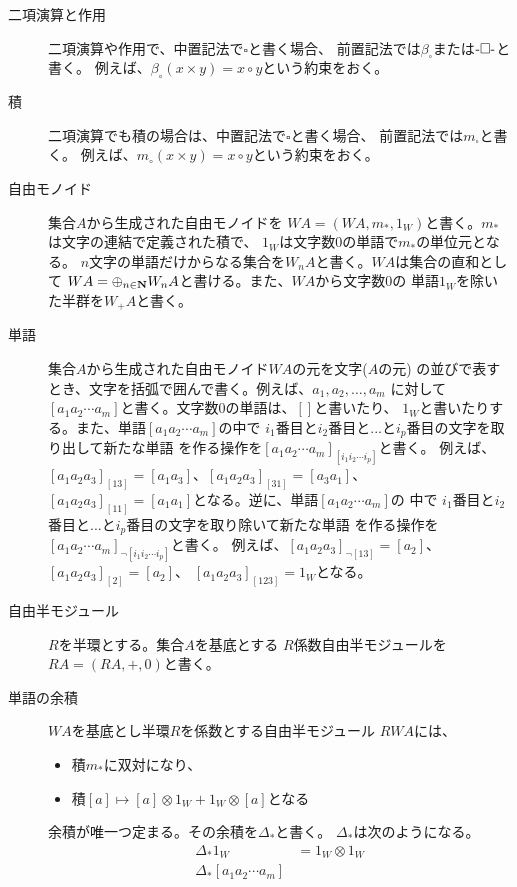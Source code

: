 	\begin{description} %
		\item[二項演算と作用]二項演算や作用で、中置記法で$\square$と書く場合、
		前置記法では$\beta_\square$または$\mybiop{\square}$と書く。
		例えば、$\beta_\circ(x\times y)=x\circ y$という約束をおく。
		\item[積]二項演算でも積の場合は、中置記法で$\square$と書く場合、
		前置記法では$m_\square$と書く。
		例えば、$m_\circ(x\times y)=x\circ y$という約束をおく。
		\item[自由モノイド]集合$A$から生成された自由モノイドを
		$WA=(WA,m_*,1_W)$と書く。$m_*$は文字の連結で定義された積で、
		$1_W$は文字数$0$の単語で$m_*$の単位元となる。
		$n$文字の単語だけからなる集合を$W_nA$と書く。$WA$は集合の直和として
		$WA = \oplus_{n\in{\mathbf{N}}}W_nA$と書ける。また、$WA$から文字数$0$の
		単語$1_W$を除いた半群を$W_+A$と書く。
		\item[単語]集合$A$から生成された自由モノイド$WA$の元を文字($A$の元)
		の並びで表すとき、文字を括弧で囲んで書く。例えば、$a_1,a_2,\dots,a_m$
		に対して$[a_1a_2\cdots a_m]$と書く。文字数$0$の単語は、$[]$と書いたり、
		$1_W$と書いたりする。また、単語$[a_1a_2\cdots a_m]$の中で
		$i_1$番目と$i_2$番目と...と$i_p$番目の文字を取り出して新たな単語
		を作る操作を$[a_1a_2\cdots a_m]_{[i_1i_2\cdots i_p]}$と書く。
		例えば、$[a_1a_2a_3]_{[13]}=[a_1a_3]$、$[a_1a_2a_3]_{[31]}=[a_3a_1]$、
		$[a_1a_2a_3]_{[11]}=[a_1a_1]$となる。逆に、単語$[a_1a_2\cdots a_m]$の
		中で $i_1$番目と$i_2$番目と...と$i_p$番目の文字を取り除いて新たな単語
		を作る操作を$[a_1a_2\cdots a_m]_{\neg[i_1i_2\cdots i_p]}$と書く。
		例えば、$[a_1a_2a_3]_{\neg[13]}=[a_2]$、$[a_1a_2a_3]_{[2]}=[a_2]$、
		$[a_1a_2a_3]_{[123]}=1_W$となる。
		\item[自由半モジュール]$R$を半環とする。集合$A$を基底とする
		$R$係数自由半モジュールを$RA=(RA,+,0)$と書く。
		\item[単語の余積]$WA$を基底とし半環$R$を係数とする自由半モジュール
		$RWA$には、
		\begin{itemize} %
			\item 積$m_*$に双対になり、
			\item 積$[a]\mapsto [a]\otimes1_W+1_W\otimes[a]$となる
		\end{itemize} %
		余積が唯一つ定まる。その余積を$\Delta_*$と書く。
		$\Delta_*$は次のようになる。
		\begin{equation*}\begin{split} %
			\Delta_*1_W &= 1_W\otimes1_W \\
			\Delta_*[a_1a_2\cdots a_m] 

\end{split}
\end{equation*}
\end{description}
